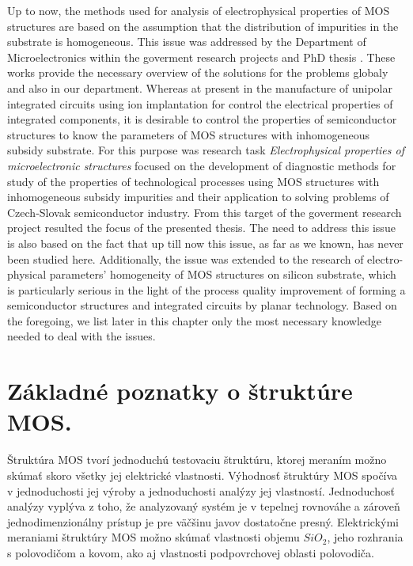 Up to now, the methods used for analysis of electrophysical properties
of MOS structures are based on the assumption that the distribution of
impurities in the substrate is homogeneous. This issue was addressed
by the Department of Microelectronics within the goverment research
projects \cite{1.1,1.2} and PhD thesis \cite{1.5,1.6,1.7,1.8}. These
works provide the necessary overview of the solutions for the problems
globaly and also in our department. Whereas at present in the
manufacture of unipolar integrated circuits using ion implantation for
control the electrical properties of integrated components, it is
desirable to control the properties of semiconductor structures to
know the parameters of MOS structures with inhomogeneous subsidy
substrate. For this purpose was research task {\em Electrophysical
  properties of microelectronic structures} \cite{1.3,1.4} focused on
the development of diagnostic methods for study of the properties of
technological processes using MOS structures with inhomogeneous
subsidy impurities and their application to solving problems of
Czech-Slovak semiconductor industry. From this target of the goverment
research project resulted the focus of the presented thesis. The need
to address this issue is also based on the fact that up till now this
issue, as far as we known, has never been studied here. Additionally,
the issue was extended to the research of electro-physical parameters'
homogeneity of MOS structures on silicon substrate, which is
particularly serious in the light of the process quality improvement
of forming a semiconductor structures and integrated circuits by
planar technology. Based on the foregoing, we list later in this
chapter only the most necessary knowledge needed to deal with the
issues.

\section{Základné poznatky o štruktúre MOS.}

Štruktúra MOS tvorí jednoduchú testovaciu štruktúru, ktorej meraním
možno skúmať skoro všetky jej elektrické vlastnosti. Výhodnosť
štruktúry MOS spočíva v jednoduchosti jej výroby a jednoduchosti
analýzy jej vlastností. Jednoduchosť analýzy vyplýva z toho, že
analyzovaný systém je v tepelnej rovnováhe a zároveň
jednodimenzionálny prístup je pre väčšinu javov dostatočne
presný. Elektrickými meraniami štruktúry MOS možno skúmať vlastnosti
objemu $SiO_2$, jeho rozhrania s polovodičom a kovom, ako aj
vlastnosti podpovrchovej oblasti polovodiča.

